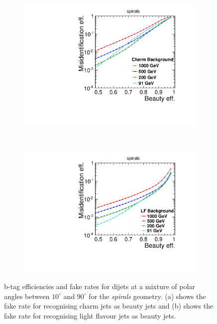 \begin{figure}[H]
        \begin{subfigure}[b]{0.5\textwidth}
          \centering
          \includegraphics[width=\textwidth]{Figures/ImpactOfGeometries/Global_energies_CLIC_SiD_spirals_Beauty_Charm_.pdf}
          \caption{}
          \label{}
        \end{subfigure}%
        ~ 
        \begin{subfigure}[b]{0.5\textwidth}
          \centering
          \includegraphics[width=\textwidth]{Figures/ImpactOfGeometries/Global_energies_CLIC_SiD_spirals_Beauty_LF_.pdf}
          \caption{}
          \label{}
        \end{subfigure}
        \caption{b-tag efficiencies and fake rates for dijets at a
          mixture of polar angles between $10^{\circ}$ and
          $90^{\circ}$ for the \textit{spirals} geometry. (a) shows the fake rate for recognising charm jets as beauty jets and (b) shows the fake rate for recognising light flavour jets as beauty jets.}\label{fig:FTEnergyDependenceB}
\end{figure}

